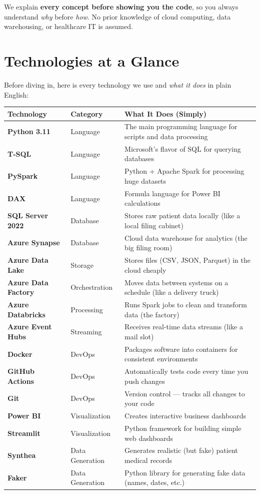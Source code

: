 \documentclass[12pt, a4paper, oneside]{report}
\begin{document}
We explain \textbf{every concept before showing you the code}, so you always understand \textit{why} before \textit{how}. No prior knowledge of cloud computing, data warehousing, or healthcare IT is assumed.

\section{Technologies at a Glance}

Before diving in, here is every technology we use and \textit{what it does} in plain English:

\begin{longtable}{>{\bfseries}p{3.5cm} p{4cm} p{6cm}}
    \toprule
    \textbf{Technology} & \textbf{Category} & \textbf{What It Does (Simply)} \\
    \midrule
    \endhead
    Python 3.11 & Language & The main programming language for scripts and data processing \\
    T-SQL & Language & Microsoft's flavor of SQL for querying databases \\
    PySpark & Language & Python + Apache Spark for processing huge datasets \\
    DAX & Language & Formula language for Power BI calculations \\
    \midrule
    SQL Server 2022 & Database & Stores raw patient data locally (like a local filing cabinet) \\
    Azure Synapse & Database & Cloud data warehouse for analytics (the big filing room) \\
    \midrule
    Azure Data Lake & Storage & Stores files (CSV, JSON, Parquet) in the cloud cheaply \\
    Azure Data Factory & Orchestration & Moves data between systems on a schedule (like a delivery truck) \\
    Azure Databricks & Processing & Runs Spark jobs to clean and transform data (the factory) \\
    Azure Event Hubs & Streaming & Receives real-time data streams (like a mail slot) \\
    \midrule
    Docker & DevOps & Packages software into containers for consistent environments \\
    GitHub Actions & DevOps & Automatically tests code every time you push changes \\
    Git & DevOps & Version control --- tracks all changes to your code \\
    \midrule
    Power BI & Visualization & Creates interactive business dashboards \\
    Streamlit & Visualization & Python framework for building simple web dashboards \\
    \midrule
    Synthea & Data Generation & Generates realistic (but fake) patient medical records \\
    Faker & Data Generation & Python library for generating fake data (names, dates, etc.) \\
    \bottomrule
\end{longtable}
\end{document}
